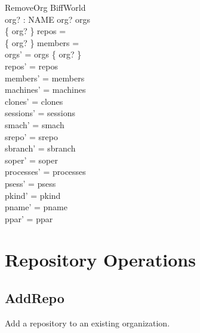\documentclass[a4paper,10pt,fleqn]{article}
\begin{document}
\begin{schema}{RemoveOrg}
  \Delta BiffWorld \\
  org? : NAME
  \where
  org? \in orgs \\
  \{ org? \} \dres repos = \emptyset \\
  \{ org? \} \dres members = \emptyset \\
  orgs' = orgs \setminus \{ org? \} \\
  repos' = repos \\
  members' = members \\
  machines' = machines \\
  clones' = clones \\
  sessions' = sessions \\
  smach' = smach \\
  srepo' = srepo \\
  sbranch' = sbranch \\
  soper' = soper \\
  processes' = processes \\
  psess' = psess \\
  pkind' = pkind \\
  pname' = pname \\
  ppar' = ppar
\end{schema}

\section{Repository Operations}

\subsection{AddRepo}

Add a repository to an existing organization.
\end{document}
